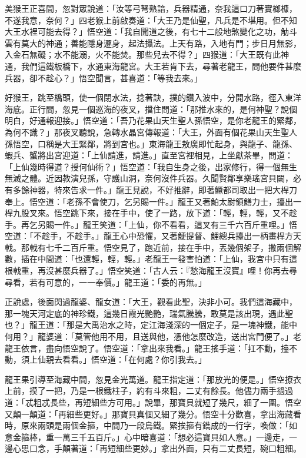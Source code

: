 美猴王正喜間，忽對眾說道：「汝等弓弩熟諳，兵器精通，奈我這口刀著實榔槺，不遂我意，奈何？」四老猴上前啟奏道：「大王乃是仙聖，凡兵是不堪用。但不知大王水裡可能去得？」悟空道：「我自聞道之後，有七十二般地煞變化之功，觔斗雲有莫大的神通；善能隱身遯身，起法攝法。上天有路，入地有門；步日月無影，入金石無礙；水不能溺，火不能焚。那些兒去不得？」四猴道：「大王既有此神通，我們這鐵板橋下，水通東海龍宮。大王若肯下去，尋著老龍王，問他要件甚麼兵器，卻不趁心？」悟空聞言，甚喜道：「等我去來。」

好猴王，跳至橋頭，使一個閉水法，捻著訣，撲的鑽入波中，分開水路，徑入東洋海底。正行間，忽見一個巡海的夜叉，擋住問道：「那推水來的，是何神聖？說個明白，好通報迎接。」悟空道：「吾乃花果山天生聖人孫悟空，是你老龍王的緊鄰，為何不識？」那夜叉聽說，急轉水晶宮傳報道：「大王，外面有個花果山天生聖人孫悟空，口稱是大王緊鄰，將到宮也。」東海龍王敖廣即忙起身，與龍子、龍孫、蝦兵、蟹將出宮迎道：「上仙請進，請進。」直至宮裡相見，上坐獻茶畢，問道：「上仙幾時得道？授何仙術？」悟空道：「我自生身之後，出家修行，得一個無生無滅之體。近因教演兒孫，守護山洞，奈何沒件兵器。久聞賢鄰享樂瑤宮貝闕，必有多餘神器，特來告求一件。」龍王見說，不好推辭，即著鱖都司取出一把大桿刀奉上。悟空道：「老孫不會使刀，乞另賜一件。」龍王又著鮊太尉領鱔力士，擡出一桿九股叉來。悟空跳下來，接在手中，使了一路，放下道：「輕，輕，輕，又不趁手。再乞另賜一件。」龍王笑道：「上仙，你不看看，這叉有三千六百斤重哩。」悟空道：「不趁手，不趁手。」龍王心中恐懼，又著鯁提督、鯉總兵擡出一柄畫桿方天戟。那戟有七千二百斤重。悟空見了，跑近前，接在手中，丟幾個架子，撒兩個解數，插在中間道：「也還輕，輕，輕。」老龍王一發害怕道：「上仙，我宮中只有這根戟重，再沒甚麼兵器了。」悟空笑道：「古人云：『愁海龍王沒寶』哩！你再去尋尋看，若有可意的，一一奉價。」龍王道：「委的再無。」

正說處，後面閃過龍婆、龍女道：「大王，觀看此聖，決非小可。我們這海藏中，那一塊天河定底的神珍鐵，這幾日霞光艷艷，瑞氣騰騰，敢莫是該出現，遇此聖也？」龍王道：「那是大禹治水之時，定江海淺深的一個定子，是一塊神鐵，能中何用？」龍婆道：「莫管他用不用，且送與他，憑他怎麼改造，送出宮門便了。」老龍王依言，盡向悟空說了。悟空道：「拿出來我看。」龍王搖手道：「扛不動，擡不動，須上仙親去看看。」悟空道：「在何處？你引我去。」

龍王果引導至海藏中間，忽見金光萬道。龍王指定道：「那放光的便是。」悟空撩衣上前，摸了一把，乃是一根鐵柱子，約有斗來粗，二丈有餘長。他儘力兩手撾過道：「忒粗忒長些，再短細些方可用。」說畢，那寶貝就短了幾尺，細了一圍。悟空又顛一顛道：「再細些更好。」那寶貝真個又細了幾分。悟空十分歡喜，拿出海藏看時，原來兩頭是兩個金箍，中間乃一段烏鐵。緊挨箍有鐫成的一行字，喚做：「如意金箍棒，重一萬三千五百斤。」心中暗喜道：「想必這寶貝如人意。」一邊走，一邊心思口念，手顛著道：「再短細些更妙。」拿出外面，只有二丈長短，碗口粗細。

